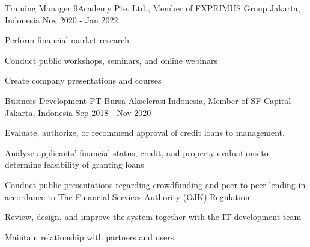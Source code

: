 \begin{cventries}
  \cventry
    {Training Manager} %
    {9Academy Pte. Ltd., Member of FXPRIMUS Group } %
    {Jakarta, Indonesia} %
    {Nov 2020 - Jan 2022} %
    {
      \begin{cvitems} %
        \item {Perform financial market research}
        \item {Conduct public workshops, seminars, and online webinars}
        \item {Create company presentations and courses}
      \end{cvitems}
    }

  \cventry
    {Business Development} %
    {PT Bursa Akselerasi Indonesia, Member of SF Capital} %
    {Jakarta, Indonesia} %
    {Sep 2018 - Nov 2020} %
    {
      \begin{cvitems} %
        \item {Evaluate, authorize, or recommend approval of credit loans to management.}
        \item {Analyze applicants’ financial status, credit, and property evaluations to determine feasibility of granting loans}
        \item {Conduct public presentations regarding crowdfunding and peer-to-peer lending in accordance to The Financial Services Authority (OJK) Regulation.}
        \item {Review, design, and improve the system together with the IT development team}
        \item {Maintain relationship with partners and users}
      \end{cvitems}
    }


\end{cventries}
